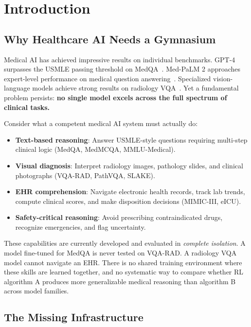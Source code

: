 \documentclass{article}
\begin{document}
\section{Introduction}
\label{sec:intro}

\subsection{Why Healthcare AI Needs a Gymnasium}

Medical AI has achieved impressive results on individual benchmarks. GPT-4 surpasses the USMLE passing threshold on MedQA~\citep{nori2023gpt4}. Med-PaLM 2 approaches expert-level performance on medical question answering~\citep{singhal2023medpalm2}. Specialized vision-language models achieve strong results on radiology VQA~\citep{chen2024huatuogpt}. Yet a fundamental problem persists: \textbf{no single model excels across the full spectrum of clinical tasks.}

Consider what a competent medical AI system must actually do:
\begin{itemize}[nosep, leftmargin=*]
    \item \textbf{Text-based reasoning}: Answer USMLE-style questions requiring multi-step clinical logic (MedQA, MedMCQA, MMLU-Medical).
    \item \textbf{Visual diagnosis}: Interpret radiology images, pathology slides, and clinical photographs (VQA-RAD, PathVQA, SLAKE).
    \item \textbf{EHR comprehension}: Navigate electronic health records, track lab trends, compute clinical scores, and make disposition decisions (MIMIC-III, eICU).
    \item \textbf{Safety-critical reasoning}: Avoid prescribing contraindicated drugs, recognize emergencies, and flag uncertainty.
\end{itemize}

These capabilities are currently developed and evaluated in \emph{complete isolation}. A model fine-tuned for MedQA is never tested on VQA-RAD. A radiology VQA model cannot navigate an EHR. There is no shared training environment where these skills are learned together, and no systematic way to compare whether RL algorithm A produces more generalizable medical reasoning than algorithm B across model families.

\subsection{The Missing Infrastructure}
\end{document}

